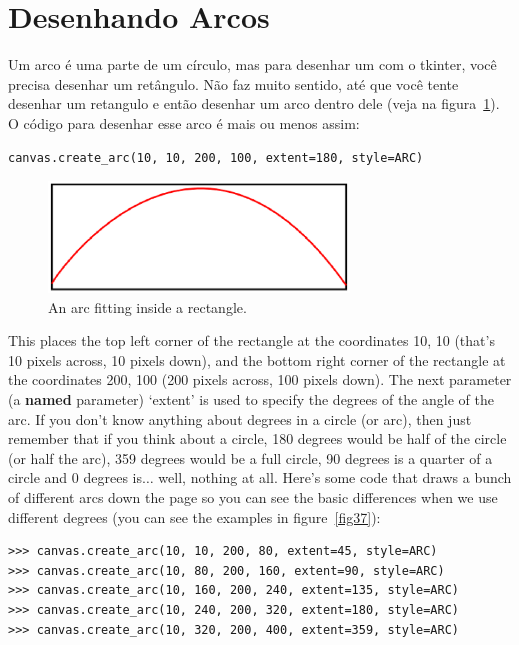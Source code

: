\section{Desenhando Arcos}

Um arco é uma parte de um círculo, mas para desenhar um com o tkinter, você precisa desenhar um retângulo. Não faz muito sentido, até que você tente desenhar um retangulo e então desenhar um arco dentro dele (veja na figura~\ref{fig36}). O código para desenhar esse arco é mais ou menos assim:

\begin{listing}
\begin{verbatim}
canvas.create_arc(10, 10, 200, 100, extent=180, style=ARC)
\end{verbatim}
\end{listing}

\begin{figure}
\begin{center}
\includegraphics[width=80mm]{eps/figure36.eps}
\end{center}
\caption{An arc fitting inside a rectangle.}\label{fig36}
\end{figure}

This places the top left corner of the rectangle at the coordinates 10, 10 (that's 10 pixels across, 10 pixels down), and the bottom right corner of the rectangle at the coordinates 200, 100 (200 pixels across, 100 pixels down).  The next parameter (a \textbf{named} parameter) `extent' is used to specify the degrees of the angle of the arc.  If you don't know anything about degrees in a circle (or arc), then just remember that if you think about a circle, 180 degrees would be half of the circle (or half the arc), 359 degrees would be a full circle, 90 degrees is a quarter of a circle and 0 degrees is$\ldots$ well, nothing at all. Here's some code that draws a bunch of different arcs down the page so you can see the basic differences when we use different degrees (you can see the examples in figure~\ref{fig37}):

\begin{listing}
\begin{verbatim}
>>> canvas.create_arc(10, 10, 200, 80, extent=45, style=ARC)
>>> canvas.create_arc(10, 80, 200, 160, extent=90, style=ARC)
>>> canvas.create_arc(10, 160, 200, 240, extent=135, style=ARC)
>>> canvas.create_arc(10, 240, 200, 320, extent=180, style=ARC)
>>> canvas.create_arc(10, 320, 200, 400, extent=359, style=ARC)
\end{verbatim}
\end{listing}

